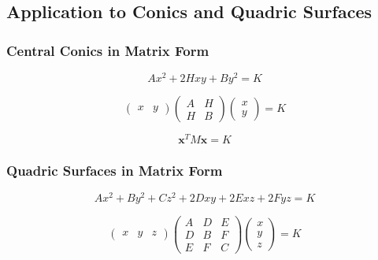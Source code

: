 \subsection{Application to Conics and Quadric Surfaces}

\subsubsection{Central Conics in Matrix Form}

\begin{equation*}
    Ax^2 + 2Hxy + By^2 = K
\end{equation*}

\begin{equation*}
    \begin{pmatrix}
        x & y
    \end{pmatrix}
    \begin{pmatrix}
        A & H \\
        H & B
    \end{pmatrix}
    \begin{pmatrix}
        x \\
        y
    \end{pmatrix}
    = K
\end{equation*}

\begin{equation*}
    \mathbf{x}^T M \mathbf{x} = K
\end{equation*}

\subsubsection{Quadric Surfaces in Matrix Form}

\begin{equation*}
    Ax^2 + By^2 + Cz^2 + 2Dxy + 2Exz + 2Fyz = K
\end{equation*}

\begin{equation*}
    \begin{pmatrix}
        x & y & z
    \end{pmatrix}
    \begin{pmatrix}
        A & D & E \\
        D & B & F \\
        E & F & C
    \end{pmatrix}
    \begin{pmatrix}
        x \\
        y \\
        z
    \end{pmatrix}
    = K
\end{equation*}

